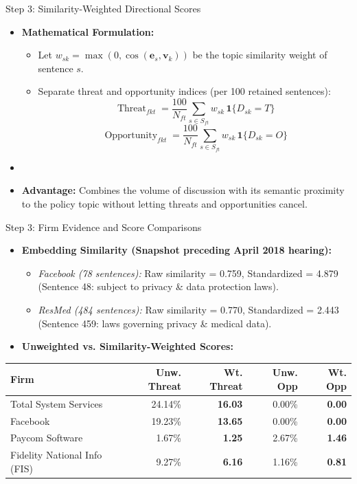 \documentclass[xcolor=x11names,compress,9pt]{beamer}
\renewcommand{\(}{\begin{columns}}
\renewcommand{\)}{\end{columns}}
\newcommand{\<}[1]{\begin{column}{#1}}
\renewcommand{\>}{\end{column}}
\begin{document}
\begin{frame}{Step 3: Similarity-Weighted Directional Scores}
    \begin{itemize}
        \item \textbf{Mathematical Formulation:}
        \begin{itemize}
            \item Let $w_{sk} = \max(0, \cos(\mathbf{e}_s, \mathbf{v}_k))$ be the topic similarity weight of sentence $s$.
            \item Separate threat and opportunity indices (per 100 retained sentences):
            $$\operatorname{Threat}_{fkt} = \frac{100}{N_{ft}}\sum_{s\in S_{ft}}w_{sk}\,\mathbf{1}\{D_{sk}=T\}$$
            $$\operatorname{Opportunity}_{fkt} = \frac{100}{N_{ft}}\sum_{s\in S_{ft}}w_{sk}\,\mathbf{1}\{D_{sk}=O\}$$
        \end{itemize}
        \item []
        \item \textbf{Advantage:} Combines the volume of discussion with its semantic proximity to the policy topic without letting threats and opportunities cancel.
    \end{itemize}
\end{frame}

\begin{frame}{Step 3: Firm Evidence and Score Comparisons}
    \begin{itemize}
        \item \textbf{Embedding Similarity (Snapshot preceding April 2018 hearing):}
        \begin{itemize}
            \item \textit{Facebook (78 sentences):} Raw similarity = 0.759, Standardized = 4.879 (Sentence 48: subject to privacy \& data protection laws).
            \item \textit{ResMed (484 sentences):} Raw similarity = 0.770, Standardized = 2.443 (Sentence 459: laws governing privacy \& medical data).
        \end{itemize}
        \item \textbf{Unweighted vs. Similarity-Weighted Scores:}
    \end{itemize}
    \vspace{0.15cm}
    \centering
    \footnotesize
    \begin{tabular}{lrrrr}
        \toprule
        \textbf{Firm} & \textbf{Unw. Threat} & \textbf{Wt. Threat} & \textbf{Unw. Opp} & \textbf{Wt. Opp} \\
        \midrule
        Total System Services & 24.14\% & \textbf{16.03} & 0.00\% & \textbf{0.00} \\
        Facebook & 19.23\% & \textbf{13.65} & 0.00\% & \textbf{0.00} \\
        Paycom Software & 1.67\% & \textbf{1.25} & 2.67\% & \textbf{1.46} \\
        Fidelity National Info (FIS) & 9.27\% & \textbf{6.16} & 1.16\% & \textbf{0.81} \\
        \bottomrule
    \end{tabular}
\end{frame}
\end{document}
